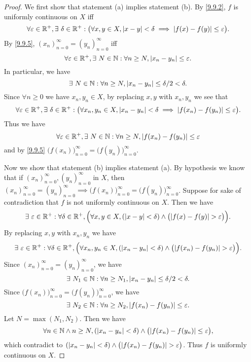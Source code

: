 \begin{proof}
  We first show that statement (a) implies statement (b).
  By \cref{9.9.2}, \(f\) is uniformly continuous on \(X\) iff
  \[
    \forall \varepsilon \in \R^+, \exists\ \delta \in \R^+ : \big(\forall x, y \in X, \abs{x - y} < \delta \implies \abs{f(x) - f(y)} \leq \varepsilon\big).
  \]
  By \cref{9.9.5}, \((x_n)_{n = 0}^\infty = (y_n)_{n = 0}^\infty\) iff
  \[
    \forall \varepsilon \in \R^+, \exists\ N \in \N : \forall n \geq N, \abs{x_n - y_n} \leq \varepsilon.
  \]
  In particular, we have
  \[
    \exists\ N \in \mathbb{N} : \forall n \geq N, \left\lvert x_n - y_n\right\rvert \leq \delta / 2 < \delta.
  \]
  Since \(\forall n \geq 0\) we have \(x_n, y_n \in X\), by replacing \(x, y\) with \(x_n, y_n\) we see that
  \[
    \forall \varepsilon \in \mathbb{R}^+, \exists\ \delta \in \mathbb{R}^+ : \big(\forall x_n, y_n \in X, \left\lvert x_n - y_n\right\rvert < \delta \implies \left\lvert f(x_n) - f(y_n)\right\rvert \leq \varepsilon\big).
  \]
  Thus we have
  \[
    \forall \varepsilon \in \mathbb{R}^+, \exists\ N \in \mathbb{N} : \forall n \geq N, \left\lvert f(x_n) - f(y_n)\right\rvert \leq \varepsilon
  \]
  and by \cref{9.9.5} \(\big(f(x_n)\big)_{n = 0}^\infty = \big(f(y_n)\big)_{n = 0}^\infty\).

  Now we show that statement (b) implies statement (a).
  By hypothesis we know that if \((x_n)_{n = 0}^\infty, (y_n)_{n = 0}^\infty\) in \(X\), then \((x_n)_{n = 0}^\infty = (y_n)_{n = 0}^\infty \implies \big(f(x_n)\big)_{n = 0}^\infty = \big(f(y_n)\big)_{n = 0}^\infty\).
  Suppose for sake of contradiction that \(f\) is not uniformly continuous on \(X\).
  Then we have
  \[
    \exists\ \varepsilon \in \R^+ : \forall \delta \in \R^+, \Big(\forall x, y \in X, (\abs{x - y} < \delta) \land \big(\abs{f(x) - f(y)} > \varepsilon\big)\Big).
  \]
  By replacing \(x, y\) with \(x_n, y_n\) we have
  \[
    \exists\ \varepsilon \in \R^+ : \forall \delta \in \R^+, \Big(\forall x_n, y_n \in X, (\abs{x_n - y_n} < \delta) \land \big(\abs{f(x_n) - f(y_n)} > \varepsilon\big)\Big).
  \]
  Since \((x_n)_{n = 0}^\infty = (y_n)_{n = 0}^\infty\), we have
  \[
    \exists\ N_1 \in \mathbb{N} : \forall n \geq N_1, \left\lvert x_n - y_n\right\rvert \leq \delta / 2 < \delta.
  \]
  Since \(\big(f(x_n)\big)_{n = 0}^\infty = \big(f(y_n)\big)_{n = 0}^\infty\), we have
  \[
    \exists\ N_2 \in \mathbb{N} : \forall n \geq N_2, \left\lvert f(x_n) - f(y_n)\right\rvert \leq \varepsilon.
  \]
  Let \(N = \max(N_1, N_2)\).
  Then we have
  \[
    \forall n \in \N \land n \geq N, (\abs{x_n - y_n} < \delta) \land \big(\abs{f(x_n) - f(y_n)} \leq \varepsilon\big),
  \]
  which contradict to \((\abs{x_n - y_n} < \delta) \land \big(\abs{f(x_n) - f(y_n)} > \varepsilon\big)\).
  Thus \(f\) is uniformly continuous on \(X\).
\end{proof}

